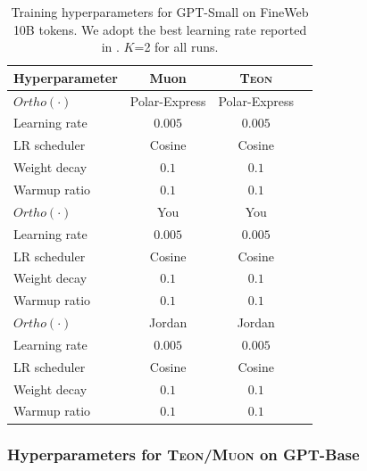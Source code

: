 \documentclass{article}
\theoremstyle{plain}
\theoremstyle{definition}
\theoremstyle{remark}
\begin{document}
\begin{table}[htb]
\centering
\begin{tabular}{lccc}
\toprule
\textbf{Hyperparameter} & \textbf{Muon} & \textbf{\textsc{Teon}} \\
\midrule
$Ortho(\cdot)$        & Polar-Express & Polar-Express \\
Learning rate           & $0.005$ & $0.005$ \\
LR scheduler            & Cosine & Cosine \\
Weight decay            & $0.1$ & $0.1$ \\
Warmup ratio            & $0.1$ & $0.1$ \\
\midrule
$Ortho(\cdot)$       & You            & You            \\
Learning rate           & $0.005$ & $0.005$ \\
LR scheduler            & Cosine & Cosine \\
Weight decay            & $0.1$ & $0.1$ \\
Warmup ratio            & $0.1$ & $0.1$ \\
\midrule
$Ortho(\cdot)$        & Jordan         & Jordan         \\
Learning rate           & $0.005$ & $0.005$ \\
LR scheduler            & Cosine & Cosine \\
Weight decay            & $0.1$ & $0.1$ \\
Warmup ratio            & $0.1$ & $0.1$ \\
\bottomrule
\end{tabular}
\caption{Training hyperparameters for GPT-Small on FineWeb 10B tokens. We adopt the best learning rate reported in \cite{amsel2025polar}. $K$=2 for all runs.}
\label{tab:hparams_gpt_small}
\end{table}

\newpage

\subsubsection{Hyperparameters for \textsc{Teon}/\textsc{Muon} on GPT-Base}
\end{document}
